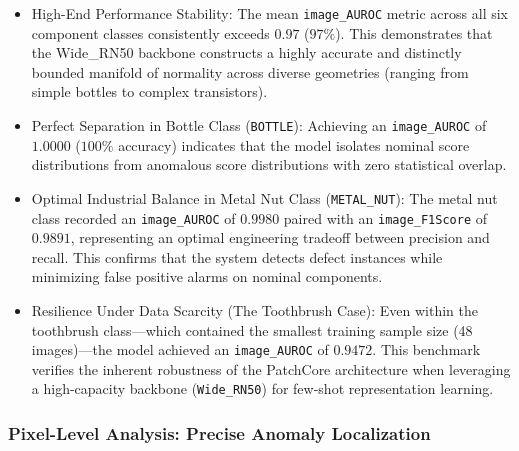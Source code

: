 \documentclass{article}
\begin{document}
\begin{itemize}
	\item High-End Performance Stability: The mean \texttt{image\_AUROC} metric across all six component classes consistently exceeds $0.97$ ($97\%$). This demonstrates that the Wide\_RN50 backbone constructs a highly accurate and distinctly bounded manifold of normality across diverse geometries (ranging from simple bottles to complex transistors).
	
	\item Perfect Separation in Bottle Class (\texttt{BOTTLE}): Achieving an \texttt{image\_AUROC} of $1.0000$ ($100\%$ accuracy) indicates that the model isolates nominal score distributions from anomalous score distributions with zero statistical overlap.
	
	\item Optimal Industrial Balance in Metal Nut Class (\texttt{METAL\_NUT}): The metal nut class recorded an \texttt{image\_AUROC} of $0.9980$ paired with an \texttt{image\_F1Score} of $0.9891$, representing an optimal engineering tradeoff between precision and recall. This confirms that the system detects defect instances while minimizing false positive alarms on nominal components.
	
	\item Resilience Under Data Scarcity (The Toothbrush Case): Even within the toothbrush class—which contained the smallest training sample size (48 images)—the model achieved an \texttt{image\_AUROC} of $0.9472$. This benchmark verifies the inherent robustness of the PatchCore architecture when leveraging a high-capacity backbone (\texttt{Wide\_RN50}) for few-shot representation learning.
\end{itemize}



\subsubsection{Pixel-Level Analysis: Precise Anomaly Localization}
\end{document}
